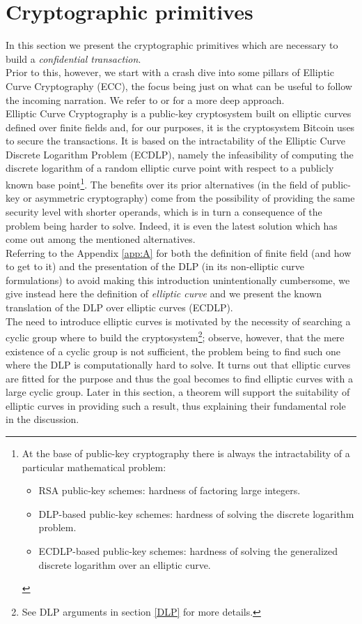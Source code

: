 \chapter{Cryptographic primitives}
\label{chpr:crypto_primitives}
In this section we present the cryptographic primitives which are necessary to build a \textit{confidential transaction}.\\
Prior to this, however, we start with a crash dive into some pillars of Elliptic Curve Cryptography (ECC), the focus being just on what can be useful to follow the incoming narration. We refer to \cite{Sec} or \cite{UnderstandingCrypto} for a more deep approach.\\
Elliptic Curve Cryptography is a public-key cryptosystem built on elliptic curves defined over finite fields and, for our purposes, it is the cryptosystem Bitcoin uses to secure the transactions. It is based on the intractability of the Elliptic Curve Discrete Logarithm Problem (ECDLP), namely the infeasibility of computing the discrete logarithm of a random elliptic curve point with respect to a publicly known base point\footnote{At the base of public-key cryptography there is always the intractability of a particular mathematical problem: \begin{itemize} \item RSA public-key schemes: hardness of factoring large integers. \item DLP-based public-key schemes: hardness of solving the discrete logarithm problem. \item ECDLP-based public-key schemes: hardness of solving the generalized discrete logarithm over an elliptic curve. \end{itemize}}. The benefits over its prior alternatives (in the field of public-key or asymmetric cryptography) come from the possibility of providing the same security level with shorter operands, which is in turn a consequence of the problem being harder to solve. Indeed, it is even the latest solution which has come out among the mentioned alternatives.\\
Referring to the Appendix \ref{app:A} for both the definition of finite field (and how to get to it) and the presentation of the DLP (in its non-elliptic curve formulations) to avoid making this introduction unintentionally cumbersome, we give instead here the definition of \textit{elliptic curve} and we present the known translation of the DLP over elliptic curves (ECDLP).\\ 
The need to introduce elliptic curves is motivated by the necessity of searching a cyclic group where to build the cryptosystem\footnote{See DLP arguments in section \ref{DLP} for more details.}; observe, however, that the mere existence of a cyclic group is not sufficient, the problem being to find such one where the DLP is computationally hard to solve. It turns out that elliptic curves are fitted for the purpose and thus the goal becomes to find elliptic curves with a large cyclic group. Later in this section, a theorem will support the suitability of elliptic curves in providing such a result, thus explaining their fundamental role in the discussion.\\
